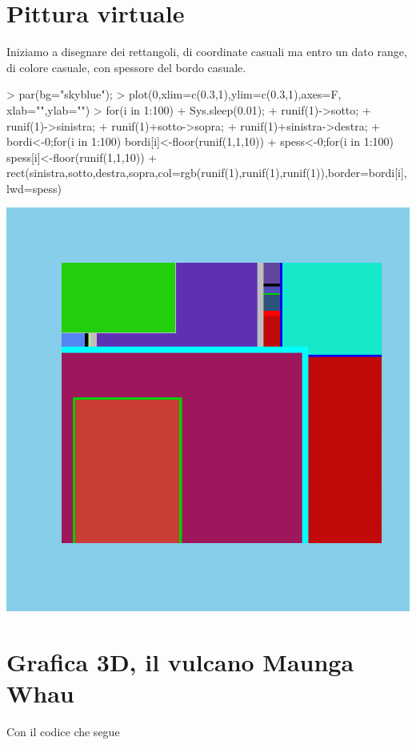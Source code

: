 \documentclass[onecolumn,11pt]{book}
\begin{document}
\section{Pittura virtuale}
Iniziamo a disegnare dei rettangoli, di coordinate casuali ma entro un dato range, di colore casuale, con spessore del bordo casuale.
\begin{Schunk}
\begin{Sinput}
> par(bg="skyblue");
> plot(0,xlim=c(0.3,1),ylim=c(0.3,1),axes=F, xlab="",ylab="")
> for(i in 1:100)
+ { Sys.sleep(0.01);
+ runif(1)->sotto;
+ runif(1)->sinistra;
+ runif(1)+sotto->sopra;
+ runif(1)+sinistra->destra;
+ bordi<-0;for(i in 1:100) bordi[i]<-floor(runif(1,1,10))
+ spess<-0;for(i in 1:100) spess[i]<-floor(runif(1,1,10))
+ rect(sinistra,sotto,destra,sopra,col=rgb(runif(1),runif(1),runif(1)),border=bordi[i],lwd=spess)}
\end{Sinput}
\end{Schunk}
\includegraphics{statisticaconR-365}
\section{Grafica 3D, il vulcano Maunga Whau}
Con il codice che segue 
 
\end{document}
